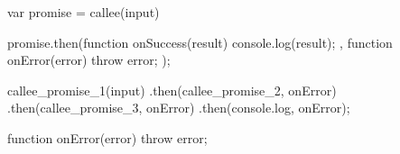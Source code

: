 

\begin{code}[js, %
             caption={Example of a Promise}, %
             label={lst:then}] %
var promise = callee(input)

promise.then(function onSuccess(result) {
  console.log(result);
}, function onError(error) {
  throw error;
});
\end{code}




\begin{code}[js, %
             caption={Example of a chain of Promises}, %
             label={lst:promises-sequence}] %
callee_promise_1(input)
.then(callee_promise_2, onError)
.then(callee_promise_3, onError)
.then(console.log, onError);

function onError(error) {
  throw error;
}
\end{code}

